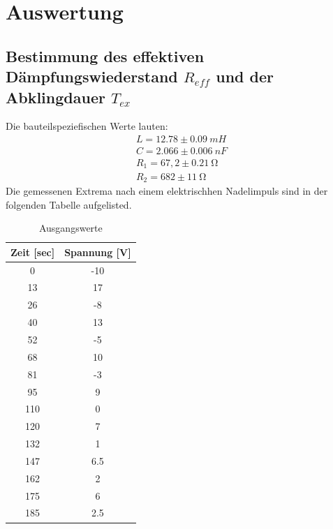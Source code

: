 \section{Auswertung}
\label{sec:Auswertung}

\subsection{Bestimmung des effektiven Dämpfungswiederstand $R_{eff}$ und der Abklingdauer $T_{ex}$}
  Die bauteilspeziefischen Werte lauten:
  \begin{align*}
    L=12.78 \pm 0.09 \ mH\\
    C=2.066 \pm 0.006 \ nF\\
    R_1=67,2 \pm 0.2 \SI{1}{\ohm}\\
    R_2=682 \pm 1 \SI{1}{\ohm}
  \end{align*}
  Die gemessenen Extrema nach einem elektrischhen Nadelimpuls sind in der folgenden Tabelle aufgelisted.
  \begin{table}[H]
    \centering
    \caption{Ausgangswerte}
    \label{tab:data}
    \begin{tabular}{c c}
      \toprule
      Zeit [sec] & Spannung [V]\\
      \midrule
      0   & -10  \\
      13  & 17  \\
      26  & -8  \\
      40  & 13  \\
      52  & -5  \\
      68  & 10  \\
      81  & -3  \\
      95  & 9  \\
      110 & 0  \\
      120 & 7  \\
      132 & 1  \\
      147 & 6.5  \\
      162 & 2  \\
      175 & 6  \\
      185 & 2.5  \\
      \bottomrule
    \end{tabular}
  \end{table}

